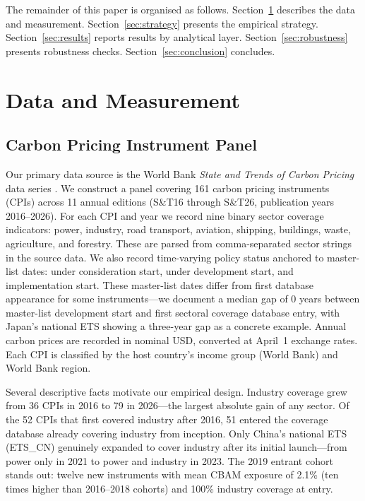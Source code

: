 \documentclass[12pt,a4paper]{article}
\begin{document}
The remainder of this paper is organised as follows. Section~\ref{sec:data} describes the data and measurement. Section~\ref{sec:strategy} presents the empirical strategy. Section~\ref{sec:results} reports results by analytical layer. Section~\ref{sec:robustness} presents robustness checks. Section~\ref{sec:conclusion} concludes.


\section{Data and Measurement}\label{sec:data}

\subsection{Carbon Pricing Instrument Panel}\label{sec:cpi_panel}

Our primary data source is the World Bank \textit{State and Trends of Carbon Pricing} data series \citep{WorldBank2025}. We construct a panel covering 161 carbon pricing instruments (CPIs) across 11 annual editions (S\&T16 through S\&T26, publication years 2016--2026). For each CPI and year we record nine binary sector coverage indicators: power, industry, road transport, aviation, shipping, buildings, waste, agriculture, and forestry. These are parsed from comma-separated sector strings in the source data. We also record time-varying policy status anchored to master-list dates: under consideration start, under development start, and implementation start. These master-list dates differ from first database appearance for some instruments---we document a median gap of 0 years between master-list development start and first sectoral coverage database entry, with Japan's national ETS showing a three-year gap as a concrete example. Annual carbon prices are recorded in nominal USD, converted at April~1 exchange rates. Each CPI is classified by the host country's income group (World Bank) and World Bank region.

Several descriptive facts motivate our empirical design. Industry coverage grew from 36 CPIs in 2016 to 79 in 2026---the largest absolute gain of any sector. Of the 52 CPIs that first covered industry after 2016, 51 entered the coverage database already covering industry from inception. Only China's national ETS (ETS\_CN) genuinely expanded to cover industry after its initial launch---from power only in 2021 to power and industry in 2023. The 2019 entrant cohort stands out: twelve new instruments with mean CBAM exposure of 2.1\% (ten times higher than 2016--2018 cohorts) and 100\% industry coverage at entry.
\end{document}
